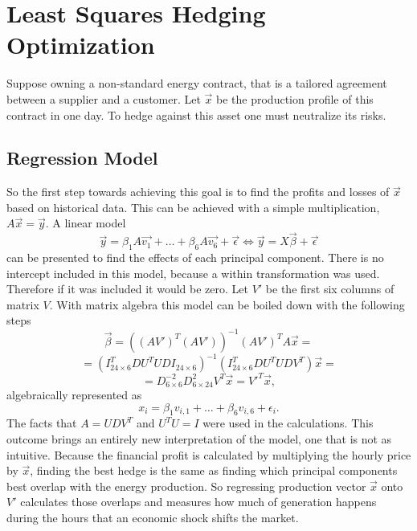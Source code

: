 \documentclass{article}
\begin{document}
\section{Least Squares Hedging Optimization}
Suppose owning a non-standard energy contract, that is a tailored agreement between a supplier and a customer.
Let $\vec{x}$ be the production profile of this contract in one day.
To hedge against this asset one must neutralize its risks.

\subsection{Regression Model}
So the first step towards achieving this goal is to find the profits and losses of $\vec{x}$ based on historical data.
This can be achieved with a simple multiplication, $A\vec{x} = \vec{y}$.
A linear model
$$
\vec{y} = \beta_1 A\vec{v_1} + \dots + \beta_6 A\vec{v_6} + \vec{\epsilon} \iff \vec{y} = X\vec{\beta} + \vec{\epsilon}
$$
can be presented to find the effects of each principal component.
There is no intercept included in this model, because a within transformation was used.
Therefore if it was included it would be zero.
Let $V'$ be the first six columns of matrix $V$.
With matrix algebra this model can be boiled down with the following steps
$$
\vec{\beta} = ((AV')^T(AV'))^{-1}(AV')^TA\vec{x} = 
$$
$$
= (I_{24\times6}^T D U^T U D I_{24\times6})^{-1}(I_{24\times6}^T D U^T U D V^T)\vec{x}=
$$
$$
= D^{-2}_{6\times6}D^2_{6\times24}V^T\vec{x} = V'^T\vec{x},
$$
algebraically represented as
$$
x_i = \beta_1v_{i,1} + \dots + \beta_6v_{i,6} + \epsilon_i.
$$
The facts that $A=UDV^T$ and $U^TU = I$ were used in the calculations.
This outcome brings an entirely new interpretation of the model, one that is not as intuitive.
Because the financial profit is calculated by multiplying the hourly price by $\vec{x}$, finding the best hedge is the same as finding which principal components best overlap with the energy production.
So regressing production vector $\vec{x}$ onto $V'$ calculates those overlaps and measures how much of  generation happens during the hours that an economic shock shifts the market.
\end{document}
